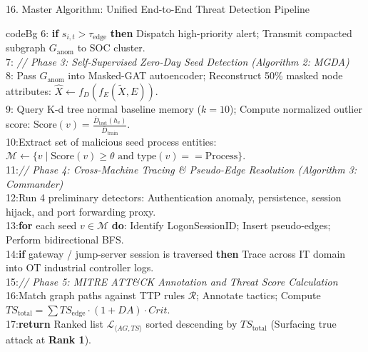 \documentclass[aspectratio=169,10pt]{beamer}
\begin{document}
\begin{frame}{16. Master Algorithm: Unified End-to-End Threat Detection Pipeline}
\begin{beamercolorbox}[rounded=true,shadow=false,sep=0.20em,wd=0.98\textwidth]{codeBg}
{6: \textbf{if} $s_{i,t} > \tau_{\text{edge}}$ \textbf{then} Dispatch high-priority alert; Transmit compacted subgraph $G_{\text{anom}}$ to SOC cluster.\\
7: \textit{// Phase 3: Self-Supervised Zero-Day Seed Detection (Algorithm 2: MGDA)}\\
8: Pass $G_{\text{anom}}$ into Masked-GAT autoencoder; Reconstruct 50\% masked node attributes: $\hat{X} \leftarrow f_D(f_E(\tilde{X}, E))$.\\
9: Query K-d tree normal baseline memory ($k=10$); Compute normalized outlier score: $\text{Score}(v) = \frac{\bar{D}_{\text{test}}(h_v)}{\bar{D}_{\text{train}}}$.\\
10:Extract set of malicious seed process entities: $\mathcal{M} \leftarrow \{v \mid \text{Score}(v) \ge \theta \text{ and type}(v) == \text{Process}\}$.\\
11:\textit{// Phase 4: Cross-Machine Tracing \& Pseudo-Edge Resolution (Algorithm 3: Commander)}\\
12:Run 4 preliminary detectors: Authentication anomaly, persistence, session hijack, and port forwarding proxy.\\
13:\textbf{for} each seed $v \in \mathcal{M}$ \textbf{do}: Identify LogonSessionID; Insert pseudo-edges; Perform bidirectional BFS.\\
14:\textbf{if} gateway / jump-server session is traversed \textbf{then} Trace across IT domain into OT industrial controller logs.\\
15:\textit{// Phase 5: MITRE ATT\&CK Annotation and Threat Score Calculation}\\
16:Match graph paths against TTP rules $\mathcal{R}$; Annotate tactics; Compute $TS_{\text{total}} = \sum TS_{\text{edge}} \cdot (1+DA) \cdot Crit$.\\
17:\textbf{return} Ranked list $\mathcal{L}_{\langle AG, TS \rangle}$ sorted descending by $TS_{\text{total}}$ (Surfacing true attack at \textbf{Rank 1}).
}
\end{beamercolorbox}
\end{frame}
\end{document}
